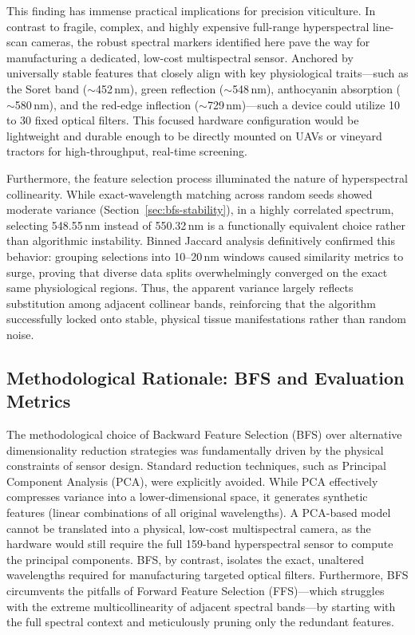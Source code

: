 \medskip\noindent
This finding has immense practical implications for precision viticulture. In contrast to fragile, complex, and highly expensive full-range hyperspectral line-scan cameras, the robust spectral markers identified here pave the way for manufacturing a dedicated, low-cost multispectral sensor. Anchored by universally stable features that closely align with key physiological traits---such as the Soret band ($\sim$452\,nm), green reflection ($\sim$548\,nm), anthocyanin absorption ($\sim$580\,nm), and the red-edge inflection ($\sim$729\,nm)---such a device could utilize 10 to 30 fixed optical filters. This focused hardware configuration would be lightweight and durable enough to be directly mounted on UAVs or vineyard tractors for high-throughput, real-time screening.

\medskip\noindent
Furthermore, the feature selection process illuminated the nature of hyperspectral collinearity. While exact-wavelength matching across random seeds showed moderate variance (Section~\ref{sec:bfs-stability}), in a highly correlated spectrum, selecting 548.55\,nm instead of 550.32\,nm is a functionally equivalent choice rather than algorithmic instability. Binned Jaccard analysis definitively confirmed this behavior: grouping selections into 10--20\,nm windows caused similarity metrics to surge, proving that diverse data splits overwhelmingly converged on the exact same physiological regions. Thus, the apparent variance largely reflects substitution among adjacent collinear bands, reinforcing that the algorithm successfully locked onto stable, physical tissue manifestations rather than random noise.

\newpage
\subsection{Methodological Rationale: BFS and Evaluation Metrics}
\noindent
The methodological choice of Backward Feature Selection (BFS) over alternative dimensionality reduction strategies was fundamentally driven by the physical constraints of sensor design. Standard reduction techniques, such as Principal Component Analysis (PCA), were explicitly avoided. While PCA effectively compresses variance into a lower-dimensional space, it generates synthetic features (linear combinations of all original wavelengths). A PCA-based model cannot be translated into a physical, low-cost multispectral camera, as the hardware would still require the full 159-band hyperspectral sensor to compute the principal components. BFS, by contrast, isolates the exact, unaltered wavelengths required for manufacturing targeted optical filters. Furthermore, BFS circumvents the pitfalls of Forward Feature Selection (FFS)---which struggles with the extreme multicollinearity of adjacent spectral bands---by starting with the full spectral context and meticulously pruning only the redundant features.

